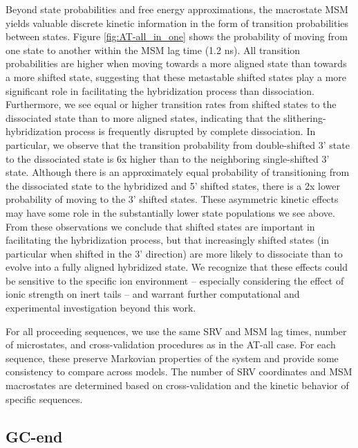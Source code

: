 \documentclass[journal=jpcbfk,manuscript=article]{achemso}
\begin{document}
Beyond state probabilities and free energy approximations, the macrostate MSM yields valuable discrete kinetic information in the form of transition probabilities between states. Figure \ref{fig:AT-all_in_one} shows the probability of moving from one state to another within the MSM lag time (1.2 ns). All transition probabilities are higher when moving towards a more aligned state than towards a more shifted state, suggesting that these metastable shifted states play a more significant role in facilitating the hybridization process than dissociation. Furthermore, we see equal or higher transition rates from shifted states to the dissociated state than to more aligned states, indicating that the slithering-hybridization process is frequently disrupted by complete dissociation. In particular, we observe that the transition probability from double-shifted 3' state to the dissociated state is 6x higher than to the neighboring single-shifted 3' state. Although there is an approximately equal probability of transitioning from the dissociated state to the hybridized and 5' shifted states, there is a 2x lower probability of moving to the 3' shifted states. These asymmetric kinetic effects may have some role in the substantially lower state populations we see above. From these observations we conclude that shifted states are important in facilitating the hybridization process, but that increasingly shifted states (in particular when shifted in the 3' direction) are more likely to dissociate than to evolve into a fully aligned hybridized state. We recognize that these effects could be sensitive to the specific ion environment -- especially considering the effect of ionic strength on inert tails -- and warrant further computational and experimental investigation beyond this work.

For all proceeding sequences, we use the same SRV and MSM lag times, number of microstates, and cross-validation procedures as in the AT-all case. For each sequence, these preserve Markovian properties of the system and provide some consistency to compare across models. The number of SRV coordinates and MSM macrostates are determined based on cross-validation and the kinetic behavior of specific sequences.


\subsection{GC-end}
\end{document}
